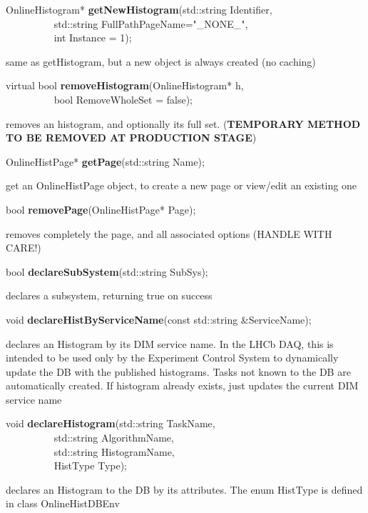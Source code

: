 \item    OnlineHistogram* {\bf getNewHistogram}(std::string Identifier,\\\mbox{}~~~~~~~~~
				   std::string FullPathPageName="\_NONE\_",\\\mbox{}~~~~~~~~~
				   int Instance = 1);

 same as getHistogram, but a new object is always created (no caching)


\item    virtual bool {\bf removeHistogram}(OnlineHistogram* h,\\\mbox{}~~~~~~~~~
			       bool RemoveWholeSet = false);

 removes an histogram, and optionally its full set. 
 ({\bf TEMPORARY METHOD TO BE REMOVED AT PRODUCTION STAGE})


\item    OnlineHistPage* {\bf getPage}(std::string Name);


 get an OnlineHistPage object, to create a new page or view/edit an existing one


\item    bool {\bf removePage}(OnlineHistPage* Page);


 removes completely the page, and all associated options (HANDLE WITH CARE!)


\item    bool {\bf declareSubSystem}(std::string SubSys);


 declares a  subsystem, returning true on success


\item    void {\bf declareHistByServiceName}(const std::string \&ServiceName);


 declares an Histogram by its DIM service name. In the LHCb
 DAQ, this is intended to be used only by the Experiment Control
 System to dynamically update the DB with the published histograms.
 Tasks not known to the DB are automatically created.
 If histogram already exists, just updates the current DIM service name 


\item    void {\bf declareHistogram}(std::string TaskName,\\\mbox{}~~~~~~~~~
			std::string AlgorithmName,\\\mbox{}~~~~~~~~~
			std::string HistogramName,\\\mbox{}~~~~~~~~~
			HistType Type);

 declares an Histogram to the DB by its attributes.  The enum HistType is defined in class OnlineHistDBEnv


